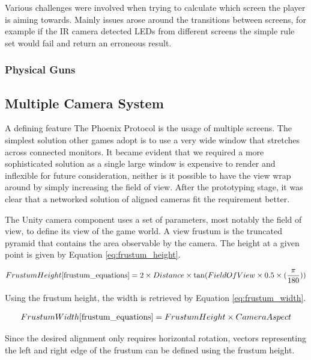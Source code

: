 \documentclass[a4paper,11pt]{article}
\begin{document}
Various challenges were involved when trying to calculate which screen the player is aiming towards. Mainly issues arose around the transitions between screens, for example if the IR camera detected LEDs from different screens the simple rule set would fail and return an erroneous result. 


\subsubsection{Physical Guns}

\subsection{Multiple Camera System}
A defining feature The Phoenix Protocol is the usage of multiple screens. The simplest solution other games adopt is to use a very wide window that stretches across connected monitors. It became evident that we required a more sophisticated solution as a single large window is expensive to render and inflexible for future consideration, neither is it possible to have the view wrap around by simply increasing the field of view. After the prototyping stage, it was clear that a networked solution of aligned cameras fit the requirement better.

The Unity camera component\cite{unity_camera} uses a set of parameters, most notably the field of view, to define its view of the game world. A view frustum\cite{unity_frustum} is the truncated pyramid that contains the area observable by the camera. The height at a given point is given by Equation \ref{eq:frustum_height}.


\begin{align}
	Frustum Height\cite{frustum_equations} = 2 \times Distance \times \tan(Field Of View \times 0.5 \times (\frac{\pi}{180}))
    \label{eq:frustum_height}
\end{align}

Using the frustum height, the width is retrieved by Equation \ref{eq:frustum_width}.

\begin{align}
	Frustum Width\cite{frustum_equations} = Frustum Height \times Camera Aspect
    \label{eq:frustum_width}
\end{align}

Since the desired alignment only requires horizontal rotation, vectors representing the left and right edge of the frustum can be defined using the frustum height.
\end{document}

